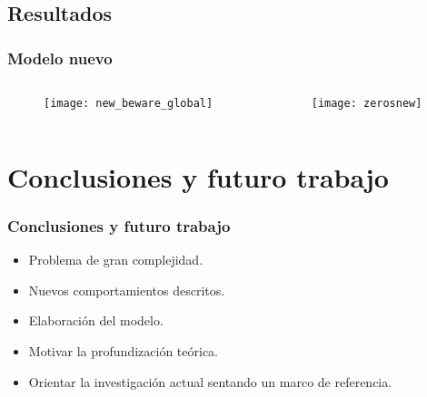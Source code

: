 \documentclass{beamer}
\begin{document}
\subsection{Resultados}

\begin{frame}
\frametitle{Modelo nuevo}
\begin{columns}
	\begin{column}{0.5\textwidth}
		\begin{figure}
			\texttt{[image: new\_beware\_global]}
		\end{figure}
	\end{column}
	\begin{column}{0.5\textwidth}
		\begin{figure}
			\texttt{[image: zerosnew]}
		\end{figure}
	\end{column}
\end{columns}
\end{frame}

\section{Conclusiones y futuro trabajo}

\begin{frame}
	\frametitle{Conclusiones y futuro trabajo}
	
	\begin{itemize}
		\item Problema de gran complejidad.
		\item Nuevos comportamientos descritos.
		\item Elaboración del modelo. 
		\item Motivar la profundización teórica.
		\item Orientar la investigación actual sentando un marco de referencia.
	\end{itemize}
\end{frame}
\end{document}
